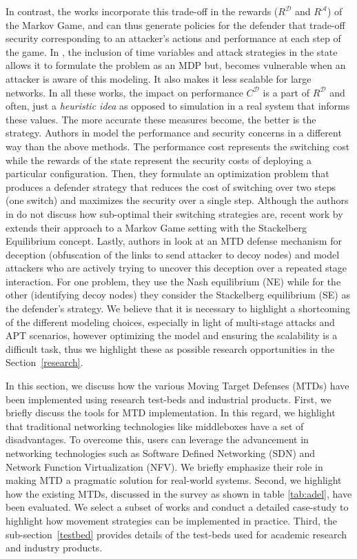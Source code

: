 In contrast, the works  incorporate this trade-off in the rewards ($R^\mathcal{D}$ and $R^\mathcal{A}$) of the Markov Game, and can thus generate policies for the defender that trade-off security corresponding to an attacker's actions and performance at each step of the game. In , the inclusion of time variables and attack strategies in the state allows it to formulate the problem as an MDP but, becomes vulnerable when an attacker is aware of this modeling. It also makes it less scalable for large networks. In all these works, the impact on performance $C^\mathcal{D}$ is a part of $R^\mathcal{D}$ and often, just a \emph{heuristic idea} as opposed to simulation in a real system that informs these values. The more accurate these measures become, the better is the strategy.
Authors in  model the performance and security concerns in a different way than the above methods. The performance cost represents the switching cost while the rewards of the state represent the security costs of deploying a particular configuration. Then, they formulate an optimization problem that produces a defender strategy that reduces the cost of switching over two steps (one switch) and maximizes the security over a single step. Although the authors in  do not discuss how sub-optimal their switching strategies are, recent work by  extends their approach to a Markov Game setting with the Stackelberg Equilibrium concept.
Lastly, authors in  look at an MTD defense mechanism for deception (obfuscation of the links to send attacker to decoy nodes) and model attackers who are actively trying to uncover this deception over a repeated stage interaction. For one problem, they use the Nash equilibrium (NE) while for the other (identifying decoy nodes) they consider the Stackelberg equilibrium (SE) as the defender's strategy. We believe that it is necessary to highlight a shortcoming of the different modeling choices, especially in light of multi-stage attacks and APT scenarios, however optimizing the model and ensuring the scalability is a difficult task, thus we highlight these as possible research opportunities in the Section~\ref{research}.

\label{sec:mtd_impl}
In this section, we discuss how the various Moving Target Defenses (MTDs) have been implemented using research test-beds and industrial products. First, we briefly discuss the tools for MTD implementation. In this regard, we highlight that traditional networking technologies like middleboxes have a set of disadvantages. To overcome this, users can leverage the advancement in networking technologies such as Software Defined Networking (SDN) and Network Function Virtualization (NFV). We briefly emphasize their role in making MTD a pragmatic solution for real-world systems. Second, we highlight how the existing MTDs, discussed in the survey as shown in table \ref{tab:adel}, have been evaluated. We select a subset of works and conduct a detailed case-study to highlight how movement strategies can be implemented in practice. Third, the sub-section~\ref{testbed} provides details of the test-beds used for academic research and industry products.

